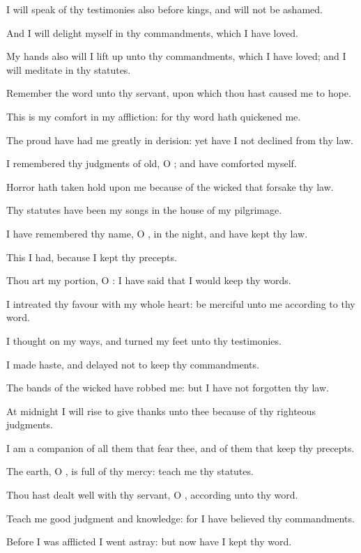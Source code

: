 \verse I will speak of thy testimonies also before kings, and will not be ashamed.

\verse And I will delight myself in thy commandments, which I have loved.

\verse My hands also will I lift up unto thy commandments, which I have loved; and I will meditate in thy statutes.

\verse Remember the word unto thy servant, upon which thou hast caused me to hope.

\verse This is my comfort in my affliction: for thy word hath quickened me.

\verse The proud have had me greatly in derision: yet have I not declined from thy law.

\verse I remembered thy judgments of old, O \LORD; and have comforted myself.

\verse Horror hath taken hold upon me because of the wicked that forsake thy law.

\verse Thy statutes have been my songs in the house of my pilgrimage.

\verse I have remembered thy name, O \LORD, in the night, and have kept thy law.

\verse This I had, because I kept thy precepts.

\verse Thou art my portion, O \LORD: I have said that I would keep thy words.

\verse I intreated thy favour with my whole heart: be merciful unto me according to thy word.

\verse I thought on my ways, and turned my feet unto thy testimonies.

\verse I made haste, and delayed not to keep thy commandments.

\verse The bands of the wicked have robbed me: but I have not forgotten thy law.

\verse At midnight I will rise to give thanks unto thee because of thy righteous judgments.

\verse I am a companion of all them that fear thee, and of them that keep thy precepts.

\verse The earth, O \LORD, is full of thy mercy: teach me thy statutes.

\verse Thou hast dealt well with thy servant, O \LORD, according unto thy word.

\verse Teach me good judgment and knowledge: for I have believed thy commandments.

\verse Before I was afflicted I went astray: but now have I kept thy word.

